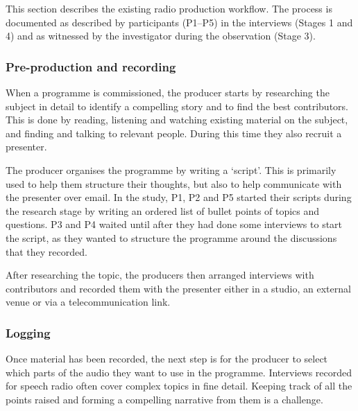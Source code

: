 
This section describes the existing radio production workflow. The process is documented as described by participants
(P1--P5) in the interviews (Stages 1 and 4) and as witnessed by the investigator during the observation (Stage 3).

\subsubsection{Pre-production and recording}
When a programme is commissioned, the producer starts by researching the subject in detail to identify a compelling
story and to find the best contributors. This is done by reading, listening and watching existing material on the
subject, and finding and talking to relevant people. During this time they also recruit a presenter.

The producer organises the programme by writing a `script'. This is primarily used to help them structure their
thoughts, but also to help communicate with the presenter over email.
In the study, P1, P2 and P5 started their scripts during the research stage by writing an ordered list of bullet points
of topics
and questions.  P3 and P4 waited until after they had done some interviews to start the script, as they wanted
to structure the programme around the discussions that they recorded.


After researching the topic, the producers then arranged interviews with contributors and recorded them with the
presenter either in a studio, an external venue or via a telecommunication link.

\subsubsection{Logging}
Once material has been recorded, the next step is for the producer to select which parts of the audio they want to use
in the programme.  Interviews recorded for speech radio often cover complex topics in fine detail. Keeping track of all
the points raised and forming a compelling narrative from them is a challenge.

